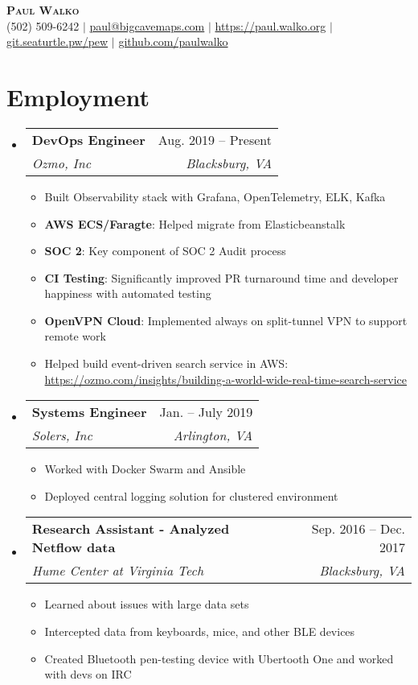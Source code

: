 \documentclass[letterpaper,12pt]{article}
\makeatletter
\newcommand{\resumeItem}[1]{
  \item\small{
    {#1 \vspace{-2pt}}
  }
}
\newcommand{\resumeSubheading}[4]{
  \vspace{-2pt}\item
    \begin{tabular*}{0.97\textwidth}[t]{l@{\extracolsep{\fill}}r}
      \textbf{#1} & #2 \\
      \textit{\small#3} & \textit{\small #4} \\
    \end{tabular*}\vspace{-7pt}
}
\newcommand{\resumeSubHeadingListStart}{\begin{itemize}[leftmargin=0.15in, label={}]}
\newcommand{\resumeSubHeadingListEnd}{\end{itemize}}
\newcommand{\resumeItemListStart}{\begin{itemize}}
\newcommand{\resumeItemListEnd}{\end{itemize}\vspace{-5pt}}
\makeatother
\begin{document}
\begin{center}
    \textbf{\Huge \scshape Paul Walko} \\ \vspace{1pt}
    \small (502) 509-6242 $|$ \href{mailto:paul@bigcavemaps.com}{paul@bigcavemaps.com} $|$ 
    \href{https://paul.walko.org}{https://paul.walko.org} $|$
    \href{https://git.seaturtle.pw/pew}{git.seaturtle.pw/pew} $|$ \href{https://github.com/paulwalko}{github.com/paulwalko}
\end{center}





\section{Employment}
  \resumeSubHeadingListStart
    \resumeSubheading
      {DevOps Engineer} {Aug. 2019 -- Present}
      {Ozmo, Inc}{Blacksburg, VA}
      \resumeItemListStart
	    \resumeItem{Built Observability stack with Grafana, OpenTelemetry, ELK, Kafka}
      	\resumeItem{\textbf{AWS ECS/Faragte}: Helped migrate from Elasticbeanstalk}
      	\resumeItem{\textbf{SOC 2}: Key component of SOC 2 Audit process}
        \resumeItem{\textbf{CI Testing}: Significantly improved PR turnaround time and developer happiness with automated testing}
        \resumeItem{\textbf{OpenVPN Cloud}: Implemented always on split-tunnel VPN to support remote work}
        \resumeItem{Helped build event-driven search service in AWS: \\ \href{https://ozmo.com/insights/building-a-world-wide-real-time-search-service/}{https://ozmo.com/insights/building-a-world-wide-real-time-search-service}}
      \resumeItemListEnd

    \resumeSubheading
      {Systems Engineer }{Jan. -- July 2019}
      {Solers, Inc}{Arlington, VA}
      \resumeItemListStart
        \resumeItem{Worked with Docker Swarm and Ansible}
        \resumeItem{Deployed central logging solution for clustered environment}
      \resumeItemListEnd

    \resumeSubheading
      {Research Assistant - Analyzed Netflow data} {Sep. 2016 -- Dec. 2017}
      {Hume Center at Virginia Tech}{Blacksburg, VA}
      \resumeItemListStart
        \resumeItem{Learned about issues with large data sets}
        \resumeItem{Intercepted data from keyboards, mice, and other BLE devices}
        \resumeItem{Created Bluetooth pen-testing device with Ubertooth One and worked with devs on IRC}
      \resumeItemListEnd
  \resumeSubHeadingListEnd
\end{document}
